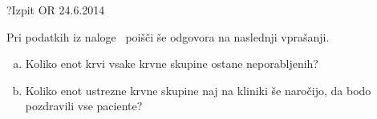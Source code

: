 \begin{naloga}{?}{Izpit OR 24.6.2014}
\begin{vprasanje}
Pri podatkih iz naloge~ poišči še odgovora na naslednji vprašanji.
\begin{enumerate}[(a)]
\item Koliko enot krvi vsake krvne skupine ostane neporabljenih?
\item Koliko enot ustrezne krvne skupine naj na kliniki še naročijo,
da bodo po\-zdra\-vi\-li vse paciente?
\end{enumerate}
\end{vprasanje}
\begin{odgovor}
\end{odgovor}
\end{naloga}
